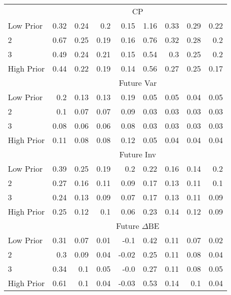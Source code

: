 \begin{table}[!ht]
\begin{tabular}{lrrrrrrrr}
  
    & \multicolumn{8}{c}{CP}  \\
     \cmidrule(r){2-5} \cmidrule(r){6-9}
    Low Prior  & 0.32  & 0.24  & 0.2  & 0.15  & 1.16  & 0.33  & 0.29  & 0.22   \\
    2  & 0.67  & 0.25  & 0.19  & 0.16  & 0.76  & 0.32  & 0.28  & 0.2   \\
    3  & 0.49  & 0.24  & 0.21  & 0.15  & 0.54  & 0.3  & 0.25  & 0.2   \\
    High Prior  & 0.44  & 0.22  & 0.19  & 0.14  & 0.56  & 0.27  & 0.25  & 0.17   \\

    & \multicolumn{8}{c}{Future Var}  \\
     \cmidrule(r){2-5} \cmidrule(r){6-9}
    Low Prior  & 0.2  & 0.13  & 0.13  & 0.19  & 0.05  & 0.05  & 0.04  & 0.05   \\
    2  & 0.1  & 0.07  & 0.07  & 0.09  & 0.03  & 0.03  & 0.03  & 0.03   \\
    3  & 0.08  & 0.06  & 0.06  & 0.08  & 0.03  & 0.03  & 0.03  & 0.03   \\
    High Prior  & 0.11  & 0.08  & 0.08  & 0.12  & 0.05  & 0.04  & 0.04  & 0.04   \\
  
    & \multicolumn{8}{c}{Future Inv}  \\
     \cmidrule(r){2-5} \cmidrule(r){6-9}
    Low Prior  & 0.39  & 0.25  & 0.19  & 0.2  & 0.22  & 0.16  & 0.14  & 0.2   \\
    2  & 0.27  & 0.16  & 0.11  & 0.09  & 0.17  & 0.13  & 0.11  & 0.1   \\
    3  & 0.24  & 0.13  & 0.09  & 0.07  & 0.17  & 0.13  & 0.11  & 0.09   \\
    High Prior  & 0.25  & 0.12  & 0.1  & 0.06  & 0.23  & 0.14  & 0.12  & 0.09   \\
    
  
    & \multicolumn{8}{c}{Future $\Delta\text{BE}$}  \\
     \cmidrule(r){2-5} \cmidrule(r){6-9}
    Low Prior  & 0.31  & 0.07  & 0.01  & -0.1  & 0.42  & 0.11  & 0.07  & 0.02   \\
    2  & 0.3  & 0.09  & 0.04  & -0.02  & 0.25  & 0.11  & 0.08  & 0.04   \\
    3  & 0.34  & 0.1  & 0.05  & -0.0  & 0.27  & 0.11  & 0.08  & 0.05   \\
    High Prior  & 0.61  & 0.1  & 0.04  & -0.03  & 0.53  & 0.14  & 0.1  & 0.04   \\
    
  
  \bottomrule
\end{tabular}
\label{tbl:Size_BMm_Prior_chars}
\end{table}